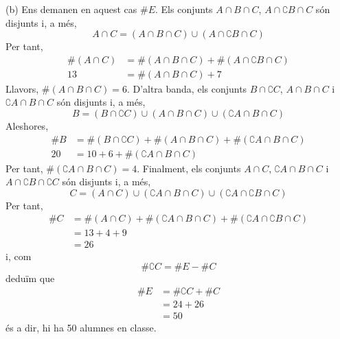 \begin{solucio}
(b) Ens demanen en aquest cas $\#E$. Els conjunts $A\cap B\cap C$, $A\cap
\complement B\cap C$ són disjunts i, a més,%
\begin{equation*}
A\cap C=\left( A\cap B\cap C\right) \cup \left( A\cap \complement B\cap
C\right)
\end{equation*}%
Per tant,%
\begin{align*}
\#\left( A\cap C\right) & =\#\left( A\cap B\cap C\right) +\#\left( A\cap
\complement B\cap C\right) \\
13& =\#\left( A\cap B\cap C\right) +7
\end{align*}%
Llavors, $\#\left( A\cap B\cap C\right) =6$. D'altra banda, els conjunts $%
B\cap \complement C$, $A\cap B\cap C$ i $\complement A\cap B\cap C$ són
disjunts i, a més,%
\begin{equation*}
B=\left( B\cap \complement C\right) \cup \left( A\cap B\cap C\right) \cup
\left( \complement A\cap B\cap C\right)
\end{equation*}%
Aleshores,%
\begin{align*}
\#B& =\#\left( B\cap \complement C\right) +\#\left( A\cap B\cap C\right)
+\#\left( \complement A\cap B\cap C\right) \\
20& =10+6+\#\left( \complement A\cap B\cap C\right)
\end{align*}%
Per tant, $\#\left( \complement A\cap B\cap C\right) =4$. Finalment, els
conjunts $A\cap C$, $\complement A\cap B\cap C$ i $A\cap \complement B\cap
\complement C$ són disjunts i, a més,%
\begin{equation*}
C=\left( A\cap C\right) \cup \left( \complement A\cap B\cap C\right) \cup
\left( \complement A\cap \complement B\cap C\right)
\end{equation*}%
Per tant,%
\begin{align*}
\#C& =\#\left( A\cap C\right) +\#\left( \complement A\cap B\cap C\right)
+\#\left( \complement A\cap \complement B\cap C\right) \\
& =13+4+9 \\
& =26
\end{align*}%
i, com%
\begin{equation*}
\#\complement C=\#E-\#C
\end{equation*}%
deduïm que%
\begin{align*}
\#E& =\#\complement C+\#C \\
& =24+26 \\
& =50
\end{align*}%
és a dir, hi ha 50 alumnes en classe.
\end{solucio}

